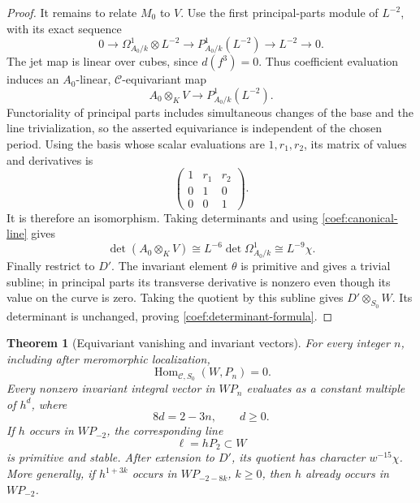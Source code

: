 \documentclass[11pt]{article}
\newtheorem{theorem}{Theorem}[section]
\theoremstyle{definition}
\theoremstyle{remark}
\numberwithin{equation}{section}
\begin{document}
\begin{proof}
It remains to relate \(M_0\) to \(V\).  Use the first
principal-parts module of \(L^{-2}\), with its exact sequence
\[
 0\longrightarrow\Omega^1_{A_0/k}\otimes L^{-2}
 \longrightarrow P^1_{A_0/k}(L^{-2})
 \longrightarrow L^{-2}\longrightarrow0.
\]
The jet map is linear over cubes, since \(d(f^3)=0\).
Thus coefficient evaluation induces an \(A_0\)-linear,
\(\mathcal C\)-equivariant map
\[
 A_0\otimes_K V\longrightarrow P^1_{A_0/k}(L^{-2}).
\]
Functoriality of principal parts includes simultaneous changes
of the base and the line trivialization, so the asserted
equivariance is independent of the chosen period.
Using the basis whose scalar evaluations are \(1,r_1,r_2\),
its matrix of values and derivatives is
\[
 \begin{pmatrix}
 1&r_1&r_2\\
 0&1&0\\
 0&0&1
 \end{pmatrix}.
\]
It is therefore an isomorphism.  Taking determinants and using
\eqref{coef:canonical-line} gives
\[
 \det(A_0\otimes_KV)
 \cong L^{-6}\det\Omega^1_{A_0/k}
 \cong L^{-9}\chi.
\]
Finally restrict to \(D'\).  The invariant element \(\theta\)
is primitive and gives a trivial subline; in principal parts
its transverse derivative is nonzero even though its value
on the curve is zero.  Taking the quotient by this subline
gives \(D'\otimes_{S_0}W\).
Its determinant is unchanged, proving
\eqref{coef:determinant-formula}.
\end{proof}

\begin{theorem}[Equivariant vanishing and invariant vectors]
\label{coef:hom-vanishing}
For every integer \(n\), including after meromorphic localization,
\[
 \operatorname{Hom}_{\mathcal C,S_0}(W,P_n)=0.
\]
Every nonzero invariant integral vector in \(WP_n\) evaluates as
a constant multiple of \(h^d\), where
\[
 8d=2-3n,\qquad d\ge0.
\]
If \(h\) occurs in \(WP_{-2}\), the corresponding line
\[
 \ell=hP_2\subset W
\]
is primitive and stable.  After extension to \(D'\), its quotient
has character \(w^{-15}\chi\).
More generally, if \(h^{1+3k}\) occurs in
\(WP_{-2-8k}\), \(k\ge0\), then \(h\) already occurs in
\(WP_{-2}\).
\end{theorem}
\end{document}
